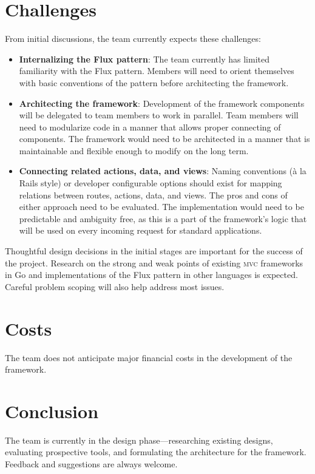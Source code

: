 \documentclass{article}
\begin{document}
\section{Challenges}

From initial discussions, the team currently expects these challenges:

\begin{itemize}
    \item \textbf{Internalizing the Flux pattern}: The team currently has limited familiarity with the Flux pattern. Members will need to orient themselves with basic conventions of the pattern before architecting the framework.
    \item \textbf{Architecting the framework}: Development of the framework components will be delegated to team members to work in parallel. Team members will need to modularize code in a manner that allows proper connecting of components. The framework would need to be architected in a manner that is maintainable and flexible enough to modify on the long term.
    \item \textbf{Connecting related actions, data, and views}: Naming conventions (à la Rails style) or developer configurable options should exist for mapping relations between routes, actions, data, and views. The pros and cons of either approach need to be evaluated. The implementation would need to be predictable and ambiguity free, as this is a part of the framework's logic that will be used on every incoming request for standard applications.
\end{itemize}

Thoughtful design decisions in the initial stages are important for the success of the project. Research on the strong and weak points of existing \textsc{mvc} frameworks in Go and implementations of the Flux pattern in other languages is expected. Careful problem scoping will also help address most issues.

\section{Costs}

The team does not anticipate major financial costs in the development of the framework. 

\section{Conclusion}

The team is currently in the design phase---researching existing designs, evaluating prospective tools, and formulating the architecture for the framework. Feedback and suggestions are always welcome.\\
\end{document}
